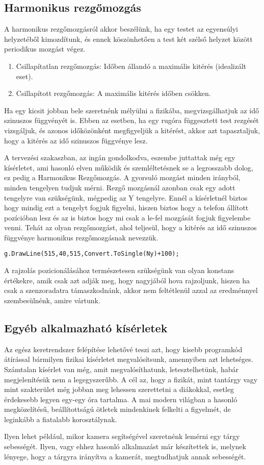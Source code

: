 \documentclass{thesis-ekf}
\theoremstyle{definition}
\theoremstyle{remark}
\begin{document}
\subsection{Harmonikus rezgőmozgás}
A harmonikus rezgőmozgásról akkor beszélünk, ha egy testet az egyensúlyi helyzetéből kimozdítunk, és ennek köszönhetően a test két szélső helyzet között periodikus mozgást végez.
\begin{enumerate}
	\item Csillapítatlan rezgőmozgás: Időben állandó a maximális kitérés (idealizált eset).
	\item Csillapított rezgőmozgás: A maximális kitérés időben csökken.
\end{enumerate}
\par Ha egy kicsit jobban bele szeretnénk mélyülni a fizikába, megvizsgálhatjuk az idő szinuszos függvényét is. Ebben az esetben, ha egy rugóra függesztett test rezgését vizsgáljuk, és azonos időközönként megfigyeljük a kitérést, akkor azt tapasztaljuk, hogy a kitérés az idő szinuszos függvénye lesz. 
\par A tervezési szakaszban, az ingán gondolkodva, eszembe juttattak még egy kísérletet, ami hasonló elven működik és szemléltetésnek se a legrosszabb dolog, ez pedig a Harmonikus Rezgőmozgás. A gyorsuló mozgást minden irányból, minden tengelyen tudjuk mérni. Rezgő mozgásnál azonban csak egy adott tengelyre van szükségünk, mégpedig az Y tengelyre. Ennél a kísérletnél biztos hogy mindig ezt a tengelyt fogjuk figyelni, hiszen biztos hogy a telefon állított pozícióban lesz és az is biztos hogy mi csak a le-fel mozgását fogjuk figyelembe venni.  Tehát az olyan rezgőmozgást, ahol teljesül, hogy a kitérés az idő szinuszos függvénye harmonikus rezgőmozgásnak nevezzük.
 \begin{lstlisting}
g.DrawLine(515,40,515,Convert.ToSingle(Ny)+100);
 \end{lstlisting}
\par A rajzolás pozicionálásához természetesen szükségünk van olyan konstans értékekre, amik csak azt adják meg, hogy nagyjából hova rajzoljunk, hiszen ha csak a szenzoradatra támaszkodnánk, akkor nem feltétlenül azzal az eredménnyel szembesülnénk, amire vártunk.
\subsection{Egyéb alkalmazható kísérletek}
Az egész keretrendszer felépítése lehetővé teszi azt, hogy kisebb programkód átírással bármilyen fizikai kísérletet megvalósítsunk, amennyiben azt lehetséges. Számtalan kísérlet van még, amit megvalósíthatunk, letesztelhetünk, habár megjelenítésük nem a legegyszerűbb. A cél az, hogy a fizikát, mint tantárgy vagy mint szakterület még jobban meg lehessen szerettetni a diákokkal, esetleg érdekesebb legyen egy-egy óra tartalma. A mai modern világban a hasonló megközelítésű, beállítottságú ötletek mindenkinek felkelti a figyelmét, de leginkább a fiatalabb korosztálynak.
\par Ilyen lehet például, mikor kamera segítségével szeretnénk lemérni egy tárgy sebességét. Ilyen, vagy ehhez hasonló alkalmazást már készítettek is, melynek lényege, hogy a tárgyra irányítva a kamerát, megtudhatjuk annak sebességét.
\end{document}
